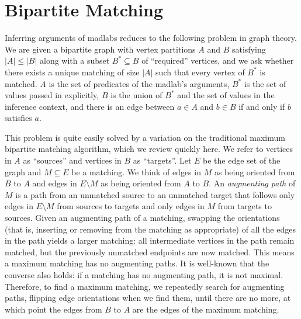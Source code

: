 \documentclass[11pt]{article}
\begin{document}
\section{Bipartite Matching}\label{bipartite}

Inferring arguments of madlabs
reduces to the following problem in graph theory.
We are given a bipartite graph with vertex partitions $A$ and $B$
satisfying $|A| \leq |B|$
along with a subset $B^* \subseteq B$ of ``required'' vertices,
and we ask whether there exists a unique matching of size $|A|$
such that every vertex of $B^*$ is matched.
$A$ is the set of predicates of the madlab's arguments,
$B^*$ is the set of values passed in explicitly,
$B$ is the union of $B^*$ and the set of values in the inference context,
and there is an edge between $a \in A$ and $b \in B$
if and only if $b$ satisfies $a$.

This problem is quite easily solved by a variation on
the traditional maximum bipartite matching algorithm,
which we review quickly here.
We refer to vertices in $A$ as ``sources'' and vertices in $B$ as ``targets''.
Let $E$ be the edge set of the graph and $M \subseteq E$ be a matching.
We think of edges in $M$ as being oriented from $B$ to $A$
and edges in $E \setminus M$ as being oriented from $A$ to $B$.
An \emph{augmenting path} of $M$ is
a path from an unmatched source to an unmatched target
that follows only edges in $E \setminus M$ from sources to targets
and only edges in $M$ from targets to sources.
Given an augmenting path of a matching,
swapping the orientations
(that is, inserting or removing from the matching as appropriate)
of all the edges in the path
yields a larger matching:
all intermediate vertices in the path remain matched,
but the previously unmatched endpoints are now matched.
This means a maximum matching has no augmenting paths.
It is well-known that the converse also holds:
if a matching has no augmenting path, it is not maximal.
Therefore, to find a maximum matching,
we repeatedly search for augmenting paths,
flipping edge orientations when we find them,
until there are no more,
at which point the edges from $B$ to $A$ are the edges of the maximum matching.
\end{document}
